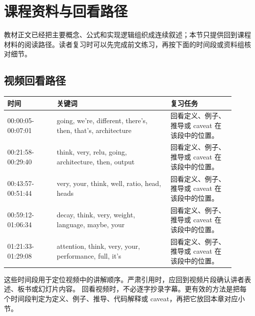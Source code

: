 \documentclass[a4paper]{article}
\begin{document}
\section{课程资料与回看路径}
教材正文已经把主要概念、公式和实现逻辑组织成连续叙述；本节只提供回到课程材料的阅读路径。读者复习时可以先完成前文练习，再按下面的时间段或资料组核对细节。
\subsection{视频回看路径}
\begin{longtable}{p{0.20\linewidth}p{0.46\linewidth}p{0.26\linewidth}}
\toprule
\textbf{时间} & \textbf{关键词} & \textbf{复习任务}\\
\midrule
00:00:05-00:07:01 & going, we're, different, there's, then, that's, architecture & 回看定义、例子、推导或 caveat 在该段中的位置。\\
00:21:58-00:29:40 & think, very, relu, going, architecture, then, output & 回看定义、例子、推导或 caveat 在该段中的位置。\\
00:43:57-00:51:44 & very, your, think, well, ratio, head, heads & 回看定义、例子、推导或 caveat 在该段中的位置。\\
00:59:12-01:06:34 & decay, think, very, weight, language, maybe, your & 回看定义、例子、推导或 caveat 在该段中的位置。\\
01:21:33-01:29:08 & attention, think, very, your, performance, full, it's & 回看定义、例子、推导或 caveat 在该段中的位置。\\
\bottomrule
\end{longtable}
这些时间段用于定位视频中的讲解顺序。严肃引用时，应回到视频片段确认讲者表述、板书或幻灯片内容。
回看视频时，不必逐字抄录字幕。更有效的方法是把每个时间段判定为定义、例子、推导、代码解释或 caveat，再把它放回本章对应小节。
\end{document}
